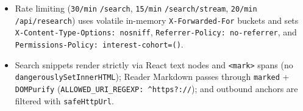 \documentclass[10pt,a4paper]{article}
\begin{document}
\begin{designnote}
\begin{itemize}[leftmargin=1.2em, itemsep=2pt]
    \item Rate limiting (\texttt{30/min} \texttt{/search}, \texttt{15/min} \texttt{/search/stream}, \texttt{20/min} \texttt{/api/research}) uses volatile in-memory \texttt{X-Forwarded-For} buckets and sets \texttt{X-Content-Type-Options: nosniff}, \texttt{Referrer-Policy: no-referrer}, and \texttt{Permissions-Policy: interest-cohort=()}.
    \item Search snippets render strictly via React text nodes and \texttt{<mark>} spans (no \texttt{dangerouslySetInnerHTML}); Reader Markdown passes through \texttt{marked} + \texttt{DOMPurify} (\texttt{ALLOWED\_URI\_REGEXP: \^{}https?://}); and outbound anchors are filtered with \texttt{safeHttpUrl}.
\end{itemize}
\end{designnote}
\end{document}
